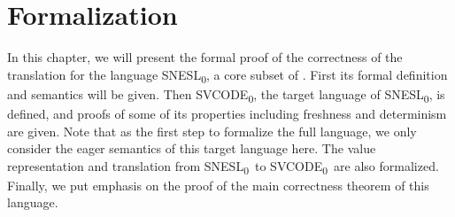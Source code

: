 
\def\fmsnesl{SNESL\textsubscript{0}}
\def\fmsvcode{SVCODE\textsubscript{0}}



\def\seval#1#2#3#4#5{\left\langle#1,#2 \right\rangle \Da^{#3} #4 \ \$ \ #5} 
\def\sevalf#1#2#3#4{{\lcall}(#1,...,#2) \Da^{#3} #4}
\def\sevalfg#1#2#3#4{#1(#2) \Da^{#3} #4}

\def\Eval#1#2#3#4{#1 \Env #2 \Eva #3 \ \$ \ #4 } 


\def\Type#1#2#3{#1 \Env #2 : #3 } 
\def\Typef#1#2#3{#1 : (#2) \rightarrow #3}
\def\TypeV#1#2{#1 : #2}

\def\ValRep#1#2#3{ #1 \mathrel{\triangleright_{#2}} #3}


\def\Vtransb#1#2#3#4{#1 \mathrel{\triangleleft_{#2}} #3,#4}

\def\wf#1#2#3{ #2 \Vdash #1 : #3} %


\def\etail#1#2{\< #1 | #2 \'>}  %

\def\PRName#1{\textsc{I-#1}}
\def\MI{\mathcal{I}}  %

\def\WName#1{\textsc{W-#1}}
\def\MW{\mathcal{W}}

\def\ConEq#1{\xlongequal{#1}}  %

\def\olol#1{\overline{\overline{#1}}}

\def\Seql#1{\{ #1_1,...,#1_l \}}

\def\emptyvtau#1{\emptyv_{#1}} 

\chapter{Formalization}


In this chapter, we will present the formal proof of the correctness of the translation for the language \fmsnesl, a core subset of \mysnesl.
First its formal definition and semantics will be given.
Then \fmsvcode, the target language of \fmsnesl, is defined, and proofs of some of its properties including freshness and determinism are given.
Note that as the first step to formalize the full language, we only consider the eager semantics of this target language here.
The value representation and translation from \fmsnesl \ to \fmsvcode \ are also formalized.
Finally, we put emphasis on the proof of the main correctness theorem of this language.



